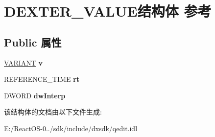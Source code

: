 \hypertarget{struct_d_e_x_t_e_r___v_a_l_u_e}{}\section{D\+E\+X\+T\+E\+R\+\_\+\+V\+A\+L\+U\+E结构体 参考}
\label{struct_d_e_x_t_e_r___v_a_l_u_e}
\subsection*{Public 属性}
\begin{DoxyCompactItemize}
\item 
\mbox{\label{struct_d_e_x_t_e_r___v_a_l_u_e_a703fcd6fc13272b081774f6347f4f3a1}} 
\hyperlink{structtag_v_a_r_i_a_n_t}{V\+A\+R\+I\+A\+NT} {\bfseries v}
\item 
\mbox{\label{struct_d_e_x_t_e_r___v_a_l_u_e_a81edb67766d156b375dda6e61c7f25e0}} 
R\+E\+F\+E\+R\+E\+N\+C\+E\+\_\+\+T\+I\+ME {\bfseries rt}
\item 
\mbox{\label{struct_d_e_x_t_e_r___v_a_l_u_e_a9817eb8779a617d2b48a54cf2020b884}} 
D\+W\+O\+RD {\bfseries dw\+Interp}
\end{DoxyCompactItemize}


该结构体的文档由以下文件生成\+:\begin{DoxyCompactItemize}
\item 
E\+:/\+React\+O\+S-\/0../sdk/include/dxsdk/qedit.\+idl\end{DoxyCompactItemize}
